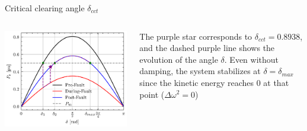 \begin{frame}[allowframebreaks]{Critical clearing angle $\delta_{cct}$}
\begin{columns}
    \begin{column}{0.55\textwidth}
\begin{center}
\includegraphics[width=0.8\linewidth]{images/P-delta-example-cct.png}
\end{center}
    \end{column}
    \begin{column}{0.4\textwidth}
The purple star corresponds to $\delta_{cct} = 0.8938$, and the dashed purple line shows the evolution of the angle $\delta$. Even without damping, the system stabilizes at $\delta = \delta_{max}$ since the kinetic energy reaches 0 at that point ($\Delta \omega^2 = 0$)
    \end{column}
\end{columns}

\end{frame}


